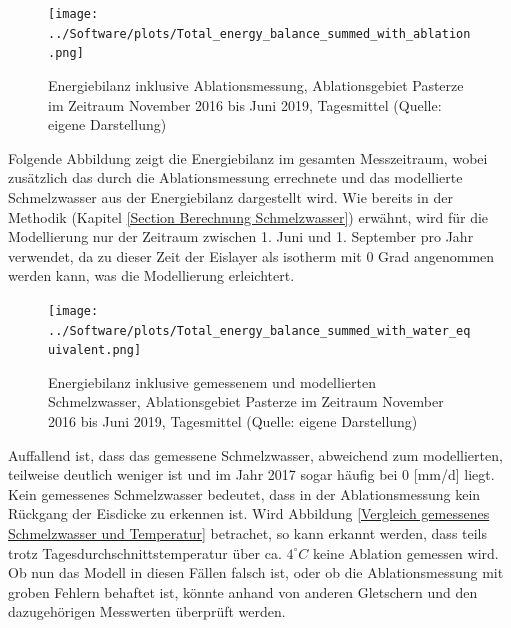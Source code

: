 \documentclass[11pt,a4paper]{article}
\begin{document}
\begin{figure}[H]
\centering
\texttt{[image: ../Software/plots/Total\_energy\_balance\_summed\_with\_ablation.png]}
\caption[Energiebilanz inklusive Ablationsmessung, Ablationsgebiet Pasterze im Zeitraum November 2016 bis Juni 2019, Tagesmittel]{Energiebilanz inklusive Ablationsmessung, Ablationsgebiet Pasterze im Zeitraum November 2016 bis Juni 2019, Tagesmittel (Quelle: eigene Darstellung)}
\label{fig:Energiebilanz im gesamten Messzeitraum inklusive Ablationsmessung}
\end{figure}


Folgende Abbildung zeigt die Energiebilanz im gesamten Messzeitraum, wobei zusätzlich das durch die Ablationsmessung errechnete und das modellierte Schmelzwasser aus der Energiebilanz dargestellt wird. Wie bereits in der Methodik (Kapitel \ref{Section Berechnung Schmelzwasser}) erwähnt, wird für die Modellierung nur der Zeitraum zwischen 1. Juni und 1. September pro Jahr verwendet, da zu dieser Zeit der Eislayer als isotherm mit 0 Grad angenommen werden kann, was die Modellierung erleichtert.  






\begin{figure}[H]
\centering
\texttt{[image: ../Software/plots/Total\_energy\_balance\_summed\_with\_water\_equivalent.png]}
\caption[Energiebilanz inklusive gemessenem und modellierten Schmelzwasser, Ablationsgebiet Pasterze im Zeitraum November 2016 bis Juni 2019, Tagesmittel]{Energiebilanz inklusive gemessenem und modellierten Schmelzwasser, Ablationsgebiet Pasterze im Zeitraum November 2016 bis Juni 2019, Tagesmittel (Quelle: eigene Darstellung)}
\label{fig:Energiebilanz im gesamten Messzeitraum inklusive gemessenem und modellierten Schmelzwasser}
\end{figure}

Auffallend ist, dass das gemessene Schmelzwasser, abweichend zum modellierten, teilweise deutlich weniger ist und im Jahr 2017 sogar häufig bei 0 [mm/d] liegt. Kein gemessenes Schmelzwasser bedeutet, dass in der Ablationsmessung kein Rückgang der Eisdicke zu erkennen ist. Wird Abbildung \ref{Vergleich gemessenes Schmelzwasser und Temperatur} betrachet, so kann erkannt werden, dass teils trotz Tagesdurchschnittstemperatur über ca. $4^\circ C$ keine Ablation gemessen wird. Ob nun das Modell in diesen Fällen falsch ist, oder ob die Ablationsmessung mit groben Fehlern behaftet ist, könnte anhand von anderen Gletschern und den dazugehörigen Messwerten überprüft werden.
\end{document}
